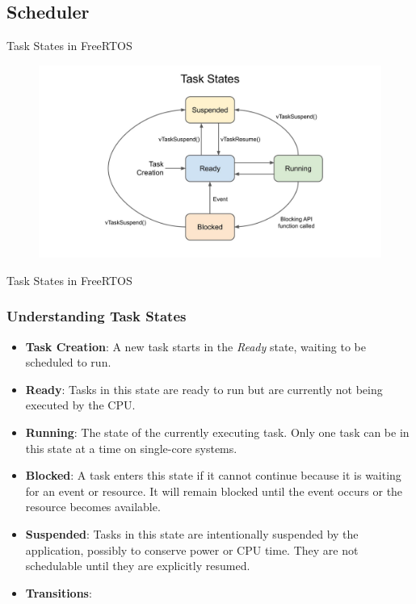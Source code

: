 \documentclass[10pt]{beamer}
\begin{document}
\subsection{Scheduler}

\begin{frame}{Task States in FreeRTOS}

  \begin{figure}[h]
    \centering
    \includegraphics[width=1.0\textwidth]{figures/FreeRTOScheduling.jpeg}
    \label{fig:FreeRTOScheduling}
  \end{figure}
\end{frame}


\begin{frame}{Task States in FreeRTOS}
  \frametitle{Understanding Task States}
  \begin{itemize}
    \item \textbf{Task Creation}: A new task starts in the \textit{Ready} state, waiting to be scheduled to run.
    \item \textbf{Ready}: Tasks in this state are ready to run but are currently not being executed by the CPU.
    \item \textbf{Running}: The state of the currently executing task. Only one task can be in this state at a time on single-core systems.
    \item \textbf{Blocked}: A task enters this state if it cannot continue because it is waiting for an event or resource. It will remain blocked until the event occurs or the resource becomes available.
    \item \textbf{Suspended}: Tasks in this state are intentionally suspended by the application, possibly to conserve power or CPU time. They are not schedulable until they are explicitly resumed.
    \item \textbf{Transitions}:
  \end{itemize}
 
\end{frame}
\end{document}
